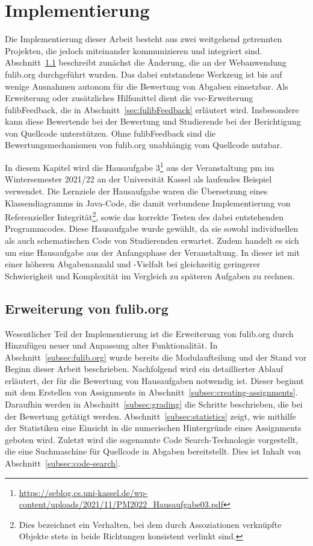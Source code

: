 \chapter{Implementierung}\label{ch:implementation}

Die Implementierung dieser Arbeit besteht aus zwei weitgehend getrennten Projekten, die jedoch miteinander kommunizieren und integriert sind.
Abschnitt~\ref{sec:expanding-fulib.org} beschreibt zunächst die Änderung, die an der Webanwendung fulib.org durchgeführt wurden.
Das dabei entstandene Werkzeug ist bis auf wenige Ausnahmen autonom für die Bewertung von Abgaben einsetzbar.
Als Erweiterung oder zusätzliches Hilfsmittel dient die \ac{vsc}-Erweiterung fulibFeedback, die in Abschnitt~\ref{sec:fulibFeedback} erläutert wird.
Insbesondere kann diese Bewertende bei der Bewertung und Studierende bei der Berichtigung von Quellcode unterstützen.
Ohne fulibFeedback sind die Bewertungsmechanismen von fulib.org unabhängig vom Quellcode nutzbar.

In diesem Kapitel wird die Hausaufgabe 3\footnote{
    \url{https://seblog.cs.uni-kassel.de/wp-content/uploads/2021/11/PM2022_Hausaufgabe03.pdf}
} aus der Veranstaltung \ac{pm} im Wintersemester 2021/22 an der Universität Kassel als laufendes Beispiel verwendet.
Die Lernziele der Hausaufgabe waren die Übersetzung eines Klassendiagramms in Java-Code, die damit verbundene Implementierung von Referenzieller Integrität\footnote{
    Dies bezeichnet ein Verhalten, bei dem durch Assoziationen verknüpfte Objekte stets in beide Richtungen konsistent verlinkt sind.
}, sowie das korrekte Testen des dabei entstehenden Programmcodes.
Diese Hausaufgabe wurde gewählt, da sie sowohl individuellen als auch schematischen Code von Studierenden erwartet.
Zudem handelt es sich um eine Hausaufgabe aus der Anfangsphase der Veranstaltung.
In dieser ist mit einer höheren Abgabenanzahl und -Vielfalt bei gleichzeitig geringerer Schwierigkeit und Komplexität im Vergleich zu späteren Aufgaben zu rechnen.

\section{Erweiterung von fulib.org}\label{sec:expanding-fulib.org}

Wesentlicher Teil der Implementierung ist die Erweiterung von fulib.org durch Hinzufügen neuer und Anpassung alter Funktionalität.
In Abschnitt~\ref{subsec:fulib.org} wurde bereits die Modulaufteilung und der Stand vor Beginn dieser Arbeit beschrieben.
Nachfolgend wird ein detaillierter Ablauf erläutert, der für die Bewertung von Hausaufgaben notwendig ist.
Dieser beginnt mit dem Erstellen von Assignments in Abschnitt~\ref{subsec:creating-assignments}.
Daraufhin werden in Abschnitt~\ref{subsec:grading} die Schritte beschrieben, die bei der Bewertung getätigt werden.
Abschnitt~\ref{subsec:statistics} zeigt, wie mithilfe der Statistiken eine Einsicht in die numerischen Hintergründe eines Assignments geboten wird.
Zuletzt wird die sogenannte Code Search-Technologie vorgestellt, die eine Suchmaschine für Quellcode in Abgaben bereitstellt.
Dies ist Inhalt von Abschnitt~\ref{subsec:code-search}.

